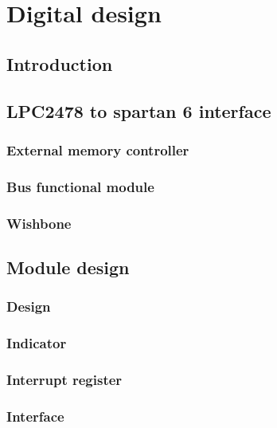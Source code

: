 \chapter{Digital design}\label{chap:digital_design}
\section{Introduction}
%

\section{LPC2478 to spartan 6 interface} \label{sec:arm_to_fpga}
%

\subsection{External memory controller}
\subsection{Bus functional module}
\subsection{Wishbone}
\section{Module design}
%

\subsection{Design}
\subsection{Indicator}
\subsection{Interrupt register}
\subsection{Interface}